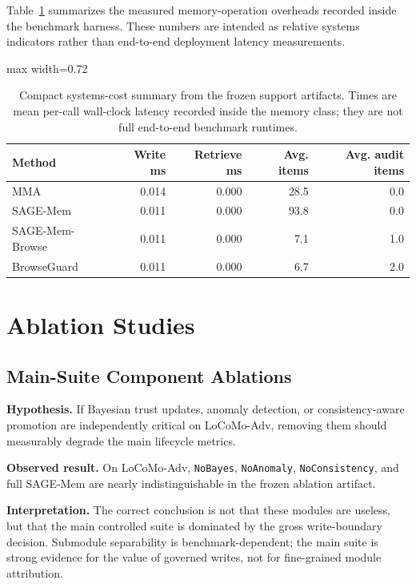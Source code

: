 \documentclass{article}
\begin{document}
Table~\ref{tab:appendix-cost} summarizes the measured memory-operation overheads recorded inside the benchmark harness. These numbers are intended as relative systems indicators rather than end-to-end deployment latency measurements.

\begin{table}[t]
\centering
\caption{Compact systems-cost summary from the frozen support artifacts. Times are mean per-call wall-clock latency recorded inside the memory class; they are not full end-to-end benchmark runtimes.}
\label{tab:appendix-cost}
\footnotesize
\setlength{\tabcolsep}{6pt}
\renewcommand{\arraystretch}{0.96}
\begin{adjustbox}{max width=0.72\textwidth}
\begin{tabular}{lrrrr}
\toprule
Method & Write ms & Retrieve ms & Avg. items & Avg. audit items \\
\midrule
MMA & 0.014 & 0.000 & 28.5 & 0.0 \\
SAGE-Mem & 0.011 & 0.000 & 93.8 & 0.0 \\
SAGE-Mem-Browse & 0.011 & 0.000 & 7.1 & 1.0 \\
BrowseGuard & 0.011 & 0.000 & 6.7 & 2.0 \\
\bottomrule
\end{tabular}
\end{adjustbox}
\end{table}

\section{Ablation Studies}

\subsection{Main-Suite Component Ablations}

\noindent\textbf{Hypothesis.} If Bayesian trust updates, anomaly detection, or consistency-aware promotion are independently critical on LoCoMo-Adv, removing them should measurably degrade the main lifecycle metrics.

\noindent\textbf{Observed result.} On LoCoMo-Adv, \texttt{NoBayes}, \texttt{NoAnomaly}, \texttt{NoConsistency}, and full SAGE-Mem are nearly indistinguishable in the frozen ablation artifact.

\noindent\textbf{Interpretation.} The correct conclusion is not that these modules are useless, but that the main controlled suite is dominated by the gross write-boundary decision. Submodule separability is benchmark-dependent; the main suite is strong evidence for the value of governed writes, not for fine-grained module attribution.
\end{document}
